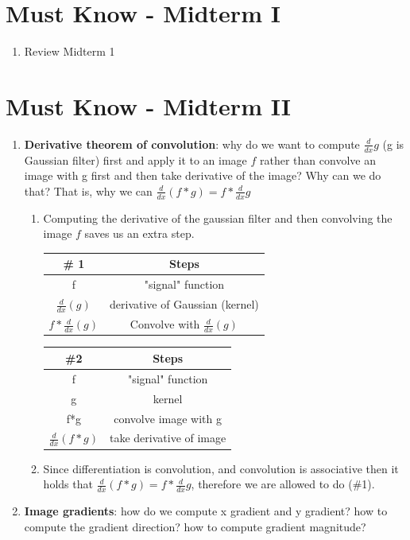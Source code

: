 \documentclass[12pt,letterpaper]{article}
\begin{document}
\section{Must Know - Midterm I}
\begin{enumerate}
    \item Review Midterm 1 
\end{enumerate}
\section{Must Know - Midterm II}
\begin{enumerate}
    \item \textbf{ Derivative theorem of convolution}:  why do we want to compute $\frac{d}{dx}g$ (g is Gaussian filter) first and apply it to an image $f$ rather than convolve an image with g first and then take derivative of the image? Why can we do that? That is, why we can $\frac{d}{dx}(f*g) = f*\frac{d}{dx}g$\\
    \color{red}
 
    \begin{enumerate}
        \item Computing the derivative of the gaussian filter and then convolving the image $f$ saves us an extra step. \\
        \begin{tabular}{|c|c|}
        \hline
        \# 1 & Steps\\
        \hline
            f & "signal" function  \\
            $\frac{d}{dx}(g)$ & derivative of Gaussian (kernel)\\
            $f*\frac{d}{dx}(g)$ & Convolve with $\frac{d}{dx}(g)$ \\
            \hline
        \end{tabular}
        \begin{tabular}{|c|c|}
        \hline
            \#2 & Steps\\
            \hline
            f & "signal" function  \\
            g & kernel \\
            f*g & convolve image with g\\
            $\frac{d}{dx}(f*g)$ & take derivative of image\\
            \hline
        \end{tabular}
        
        \item Since differentiation is convolution, and convolution is associative then it holds that $\frac{d}{dx}(f*g) = f*\frac{d}{dx}g$, therefore we are allowed to do (\#1). 
    \end{enumerate}
    \color{black}
    \item \textbf{Image gradients}: how do we compute x  gradient and y gradient? how to compute the gradient direction? how to compute gradient magnitude?\\
    

\end{enumerate}
\end{document}
